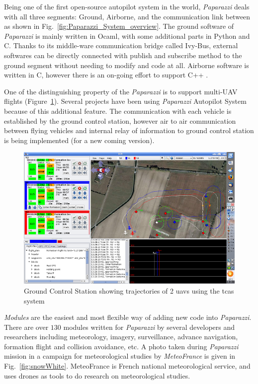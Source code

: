 Being one of the first open-source autopilot system in the world, \emph{Paparazzi} deals with all three segments: Ground, Airborne, and the communication link between as shown in Fig.~\ref{fig:Paparazzi_System_overview}. 
The ground software of \emph{Paparazzi} is mainly written in Ocaml, with some additional parts in Python and C. 
Thanks to its middle-ware communication bridge called Ivy-Bus, external softwares can be directly connected with publish and subscribe method to the ground segment without needing to modify and code at all.
Airborne software is written in C, however there is an on-going effort to support C++ \cite{baskaya2016flexible}.

One of the distinguishing property of the \emph{Paparazzi} is to support multi-UAV flights (Figure~\ref{fig:pic2}). Several projects have been using \emph{Paparazzi} Autopilot System because of this additional feature. The communication with each vehicle is established by the ground control station, however air to air communication between flying vehicles and internal relay of information to ground control station is being implemented (for a new coming version).

\begin{figure}
	\centering
	\includegraphics[width=1\textwidth]{figures/pic2}
	\caption{Ground Control Station showing trajectories of 2 \gls{uav}s using the \gls{tcas} system}
	\label{fig:pic2}
\end{figure}

\emph{Modules} are the easiest and most flexible way of adding new code into \emph{Paparazzi}. 
There are over $130$ modules written for \emph{Paparazzi} by several developers and researchers including meteorology, imagery, surveillance, advance navigation, formation flight and collision avoidance, etc. 
A photo taken during \emph{Paparazzi} mission in a campaign for meteorological studies by \emph{MeteoFrance} is given in Fig.~\ref{fig:snowWhite}. 
MeteoFrance is French national meteorological service, and uses drones as tools to do research on meteorological studies.


